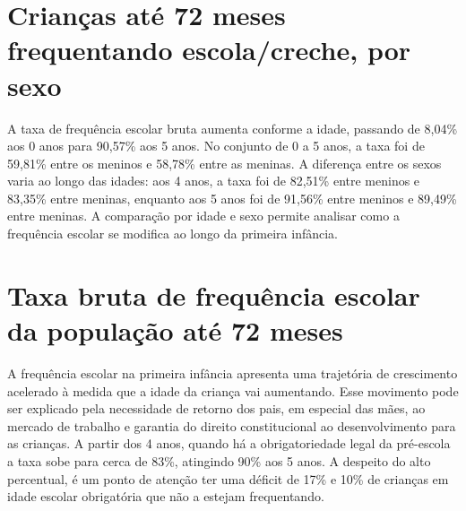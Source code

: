 
\section{Crianças até 72 meses frequentando escola/\allowbreak{}creche, por sexo}


A taxa de frequência escolar bruta aumenta conforme a idade, passando de 8,04\% aos 0 anos para 90,57\% aos 5 anos. No conjunto de 0 a 5 anos, a taxa foi de 59,81\% entre os meninos e 58,78\% entre as meninas. A diferença entre os sexos varia ao longo das idades: aos 4 anos, a taxa foi de 82,51\% entre meninos e 83,35\% entre meninas, enquanto aos 5 anos foi de 91,56\% entre meninos e 89,49\% entre meninas. A comparação por idade e sexo permite analisar como a frequência escolar se modifica ao longo da primeira infância.


\section{Taxa bruta de frequência escolar da população até 72 meses}


A frequência escolar na primeira infância apresenta uma trajetória de crescimento acelerado à medida que a idade da criança vai aumentando. Esse movimento pode ser explicado pela necessidade de retorno dos pais, em especial das mães, ao mercado de trabalho e garantia do direito constitucional ao desenvolvimento para as crianças. A partir dos 4 anos, quando há a obrigatoriedade legal da pré-escola a taxa sobe para cerca de 83\%, atingindo 90\% aos 5 anos. A despeito do alto percentual, é um ponto de atenção ter uma déficit de 17\% e 10\% de crianças em idade escolar obrigatória que não a estejam frequentando.

